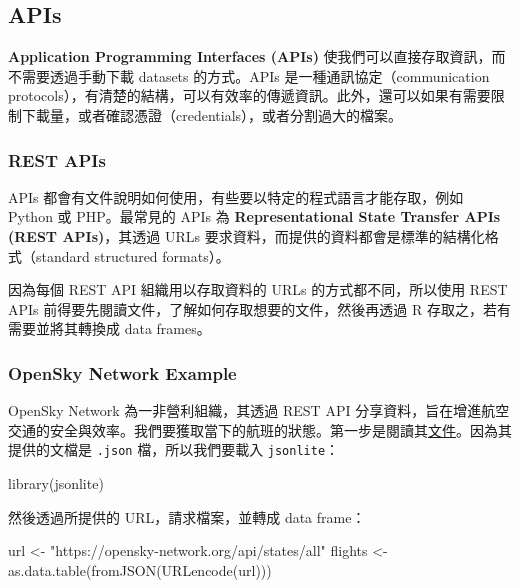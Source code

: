\documentclass[
]{book}
\newenvironment{Shaded}{\begin{snugshade}}{\end{snugshade}}
\newcommand{\FunctionTok}[1]{\textcolor[rgb]{0.00,0.00,0.00}{#1}}
\newcommand{\NormalTok}[1]{#1}
\newcommand{\OtherTok}[1]{\textcolor[rgb]{0.56,0.35,0.01}{#1}}
\newcommand{\StringTok}[1]{\textcolor[rgb]{0.31,0.60,0.02}{#1}}
\theoremstyle{definition}
\theoremstyle{remark}
\begin{document}
\hypertarget{apis}{%
\subsection{APIs}\label{apis}}

\textbf{Application Programming Interfaces (APIs)} 使我們可以直接存取資訊，而不需要透過手動下載 datasets 的方式。APIs 是一種通訊協定（communication protocols），有清楚的結構，可以有效率的傳遞資訊。此外，還可以如果有需要限制下載量，或者確認憑證（credentials），或者分割過大的檔案。

\hypertarget{rest-apis}{%
\subsubsection{REST APIs}\label{rest-apis}}

APIs 都會有文件說明如何使用，有些要以特定的程式語言才能存取，例如 Python 或 PHP。最常見的 APIs 為 \textbf{Representational State Transfer APIs (REST APIs)}，其透過 URLs 要求資料，而提供的資料都會是標準的結構化格式（standard structured formats）。

因為每個 REST API 組織用以存取資料的 URLs 的方式都不同，所以使用 REST APIs 前得要先閱讀文件，了解如何存取想要的文件，然後再透過 R 存取之，若有需要並將其轉換成 data frames。

\hypertarget{opensky-network-example}{%
\subsubsection{OpenSky Network Example}\label{opensky-network-example}}

OpenSky Network 為一非營利組織，其透過 REST API 分享資料，旨在增進航空交通的安全與效率。我們要獲取當下的航班的狀態。第一步是閱讀其\href{https://opensky-network.org/apidoc/rest.html}{文件}。因為其提供的文檔是 \texttt{.json} 檔，所以我們要載入 \texttt{jsonlite}：

\begin{Shaded}
\begin{Highlighting}[]
\FunctionTok{library}\NormalTok{(jsonlite)}
\end{Highlighting}
\end{Shaded}

然後透過所提供的 URL，請求檔案，並轉成 data frame：

\begin{Shaded}
\begin{Highlighting}[]
\NormalTok{url }\OtherTok{\textless{}{-}} \StringTok{"https://opensky{-}network.org/api/states/all"}
\NormalTok{flights }\OtherTok{\textless{}{-}} \FunctionTok{as.data.table}\NormalTok{(}\FunctionTok{fromJSON}\NormalTok{(}\FunctionTok{URLencode}\NormalTok{(url)))}
\end{Highlighting}
\end{Shaded}
\end{document}
